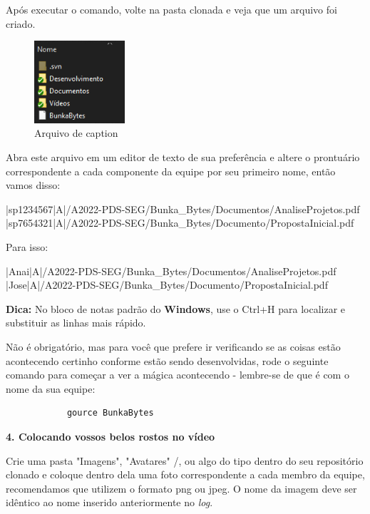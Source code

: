 Após executar o comando, volte na pasta clonada e veja que um arquivo foi criado.

\begin{figure}[htb]
        \centering
        \caption{Arquivo de caption}
        \includegraphics[width=0.3\textwidth]{anexos/Imagens_Blog/arquivo_log.png}
        \end{figure}
        \FloatBarrier

Abra este arquivo em um editor de texto de sua preferência e altere o prontuário correspondente a cada componente da equipe por seu primeiro nome, então vamos disso:

|sp1234567|A|/A2022-PDS-SEG/Bunka\_Bytes/Documentos/AnaliseProjetos.pdf \\
|sp7654321|A|/A2022-PDS-SEG/Bunka\_Bytes/Documento/PropostaInicial.pdf

Para isso:

|Anai|A|/A2022-PDS-SEG/Bunka\_Bytes/Documentos/AnaliseProjetos.pdf \\
|Jose|A|/A2022-PDS-SEG/Bunka\_Bytes/Documento/PropostaInicial.pdf

\textbf{Dica:} No bloco de notas padrão do \textbf{Windows}, use o Ctrl+H para localizar e substituir as linhas mais rápido.

Não é obrigatório, mas para você que prefere ir verificando se as coisas estão acontecendo certinho conforme estão sendo desenvolvidas, rode o seguinte comando para começar a ver a mágica acontecendo - lembre-se de que é com o nome da sua equipe:

\lstset{language=Fortran,
             basicstyle=\ttfamily\small,
             showstringspaces=false
    }
        \begin{lstlisting} 
            gource BunkaBytes
        \end{lstlisting}
        
\textbf{4. Colocando vossos belos rostos no vídeo}

Crie uma pasta "Imagens", "Avatares" /, ou algo do tipo dentro do seu repositório clonado e coloque dentro dela uma foto correspondente a cada membro da equipe, recomendamos que utilizem o formato png ou jpeg. O nome da imagem deve ser idêntico ao nome inserido anteriormente no \textit{log}. 

